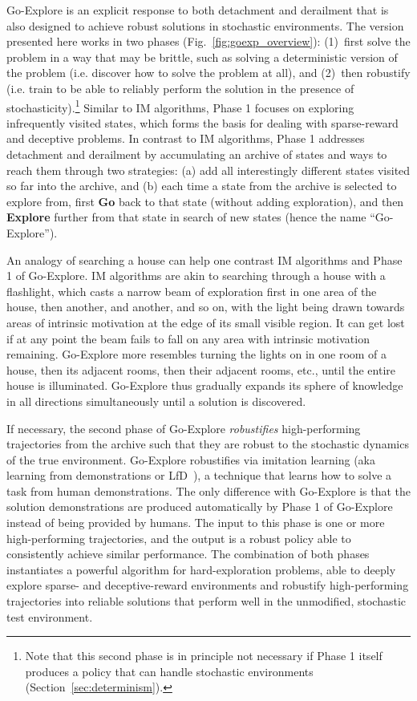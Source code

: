 \documentclass{article}
\begin{document}
Go-Explore is an explicit response to both detachment and derailment that is also designed to achieve robust solutions in stochastic environments. The version presented here works in two phases (Fig.~\ref{fig:goexp_overview}): (1)~first solve the problem in a way that may be brittle, such as solving a deterministic version of the problem (i.e. discover how to solve the problem at all), and (2)~then robustify (i.e. train to be able to reliably perform the solution in the presence of stochasticity).\footnote{Note that this second phase is in principle not necessary if Phase 1 itself produces a policy that can handle stochastic environments (Section~\ref{sec:determinism}).} Similar to IM algorithms, Phase 1 focuses on exploring infrequently visited states, which forms the basis for dealing with sparse-reward and deceptive problems. In contrast to IM algorithms, Phase 1 addresses detachment and derailment by accumulating an archive of states and ways to reach them through two strategies: (a) add all interestingly different states visited so far into the archive, and (b) each time a state from the archive is selected to explore from, first \textbf{Go} back to that state (without adding exploration), and then \textbf{Explore} further from that state in search of new states (hence the name ``Go-Explore''). 

An analogy of searching a house can help one contrast IM algorithms and Phase 1 of Go-Explore. IM algorithms are akin to searching through a house with a flashlight, which casts a narrow beam of exploration first in one area of the house, then another, and another, and so on, with the light being drawn towards areas of intrinsic motivation at the edge of its small visible region. It can get lost if at any point the beam fails to fall on any area with intrinsic motivation remaining. Go-Explore more resembles turning the lights on in one room of a house, then its adjacent rooms, then their adjacent rooms, etc., until the entire house is illuminated. Go-Explore thus gradually expands its sphere of knowledge in all directions simultaneously until a solution is discovered. 

If necessary, the second phase of Go-Explore \emph{robustifies} high-performing trajectories from the
archive such that they are robust to the stochastic dynamics of the true environment.
Go-Explore robustifies via imitation learning (aka learning from demonstrations or LfD~\cite{hester2017deep,pohlen2018observe,salimans2018learning,Ho2016GenerativeAI}), a technique that learns how to solve a task from human demonstrations. The only difference with Go-Explore is that the solution demonstrations are produced automatically by Phase 1 of Go-Explore instead of being provided by humans. 
The input to this phase is one or more high-performing trajectories, and the output is a robust policy able to consistently achieve similar performance.
The combination of both phases instantiates a powerful algorithm for hard-exploration problems, able to deeply explore sparse- and deceptive-reward environments and robustify high-performing trajectories into reliable solutions that perform well in the unmodified, stochastic test environment. 
\end{document}
